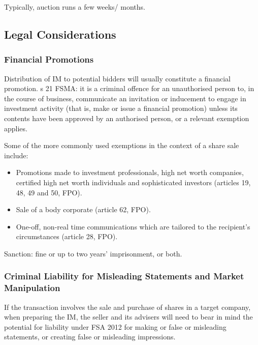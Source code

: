 \documentclass[
]{article}
\providecommand{\tightlist}{%
  \setlength{\itemsep}{0pt}\setlength{\parskip}{0pt}}
\begin{document}
Typically, auction runs a few weeks/ months.

\hypertarget{legal-considerations}{%
\subsection{Legal Considerations}\label{legal-considerations}}

\hypertarget{financial-promotions}{%
\subsubsection{Financial Promotions}\label{financial-promotions}}

Distribution of IM to potential bidders will usually constitute a
financial promotion. s 21 FSMA: it is a criminal offence for an
unauthorised person to, in the course of business, communicate an
invitation or inducement to engage in investment activity (that is, make
or issue a financial promotion) unless its contents have been approved
by an authorised person, or a relevant exemption applies.

Some of the more commonly used exemptions in the context of a share sale
include:

\begin{itemize}
\tightlist
\item
  Promotions made to investment professionals, high net worth companies,
  certified high net worth individuals and sophisticated investors
  (articles 19, 48, 49 and 50, FPO).
\item
  Sale of a body corporate (article 62, FPO).
\item
  One-off, non-real time communications which are tailored to the
  recipient's circumstances (article 28, FPO).
\end{itemize}

Sanction: fine or up to two years' imprisonment, or both.

\hypertarget{criminal-liability-for-misleading-statements-and-market-manipulation}{%
\subsubsection{Criminal Liability for Misleading Statements and Market
Manipulation}\label{criminal-liability-for-misleading-statements-and-market-manipulation}}

If the transaction involves the sale and purchase of shares in a target
company, when preparing the IM, the seller and its advisers will need to
bear in mind the potential for liability under FSA 2012 for making or
false or misleading statements, or creating false or misleading
impressions.
\end{document}
